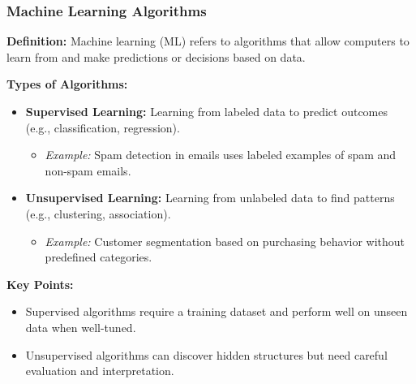 \documentclass[aspectratio=169]{beamer}
\begin{document}
\begin{frame}[fragile]
    \frametitle{Machine Learning Algorithms}
    \textbf{Definition:} Machine learning (ML) refers to algorithms that allow computers to learn from and make predictions or decisions based on data. 

    \textbf{Types of Algorithms:}
    \begin{itemize}
        \item \textbf{Supervised Learning:} Learning from labeled data to predict outcomes (e.g., classification, regression).
            \begin{itemize}
                \item \textit{Example:} Spam detection in emails uses labeled examples of spam and non-spam emails.
            \end{itemize}
        \item \textbf{Unsupervised Learning:} Learning from unlabeled data to find patterns (e.g., clustering, association).
            \begin{itemize}
                \item \textit{Example:} Customer segmentation based on purchasing behavior without predefined categories.
            \end{itemize}
    \end{itemize}
    
    \textbf{Key Points:}
    \begin{itemize}
        \item Supervised algorithms require a training dataset and perform well on unseen data when well-tuned.
        \item Unsupervised algorithms can discover hidden structures but need careful evaluation and interpretation.
    \end{itemize}
\end{frame}
\end{document}
